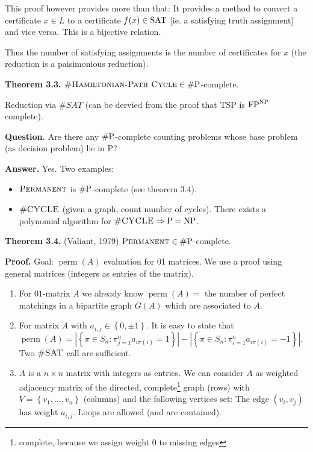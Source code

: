 \documentclass[a4paper]{article}
\newcommand{\cls}[1]{\rm{#1}}
\newcommand{\probl}[1]{\text{\textsc{#1}}}
\newcommand{\card}[1]{|#1|}
\newcommand{\set}[1]{\left\{#1\right\}}
\begin{document}
This proof however provides more than that: It provides a method
to convert a certificate $x \in L$ to a certificate $f(x) \in \cls{SAT}$
[ie. a satisfying truth assignment] and vice versa. This is a
bijective relation.

Thus the number of satisfying assignments is the number of certificates for $x$
(the reduction is a paisimonious reduction).

\textbf{Theorem 3.3.}
  $\probl{\#Hamiltonian-Path Cycle} \in \cls{\#P}$-complete.

Reduction via $\#SAT$ (can be dervied from the proof that TSP is
$\cls{FP}^{\cls{NP}}$ complete).

\textbf{Question.}
  Are there any $\cls{\#P}$-complete counting problems whose base problem
  (as decision problem) lie in \cls{P}?

\textbf{Answer.} Yes. Two examples:

\begin{itemize}
  \item $\probl{Permanent}$ is $\cls{\#P}$-complete (see theorem 3.4).
  \item $\probl{\#CYCLE}$ (given a graph, count number of cycles).
        There exists a polynomial algorithm for $\probl{\#CYCLE}
        \Rightarrow \cls{P} = \cls{NP}$.
\end{itemize}

\textbf{Theorem 3.4.} (Valiant, 1979)
  $\probl{Permanent} \in \cls{\#P}$-complete.

\textbf{Proof.}
  Goal: $\operatorname{perm}(A)$ evaluation for 01 matrices.
  We use a proof using general matrices (integers as entries of
  the matrix).

\begin{enumerate}
  \item For $01$-matrix $A$ we already know $\operatorname{perm}(A) =$
        the number of perfect matchings in a bipartite graph
        $G(A)$ which are associated to $A$.
  \item For matrix $A$ with $a_{i,j} \in \set{0, \pm 1}$.
        It is easy to state that $\operatorname{perm}(A) =
        \card{\set{\pi \in S_n: \pi_{j = 1}^n a_{i\pi(i)} = 1}} -
        \card{\set{\pi \in S_n: \pi_{i = 1}^n a_{i\pi(i)} = -1}}$.
        Two $\probl{\#SAT}$ call are sufficient.
  \item $A$ is a $n\times n$ matrix with integers as entries.
        We can consider $A$ as weighted adjacency matrix
        of the directed, complete\footnote{complete, because we
        assign weight 0 to missing edges} graph (rows) with
        $V = \set{v_1, \ldots, v_n}$ (columns) and
        the following vertices set:
        The edge $(v_i, v_j)$ has weight $a_{i,j}$.
        Loops are allowed (and are contained).
\end{enumerate}
\end{document}
